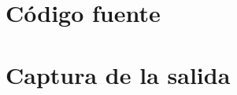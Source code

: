 \section{Código fuente}

\resetallcounters

\clearpage

\section{Captura de la salida}

\resetallcounters

\clearpage



